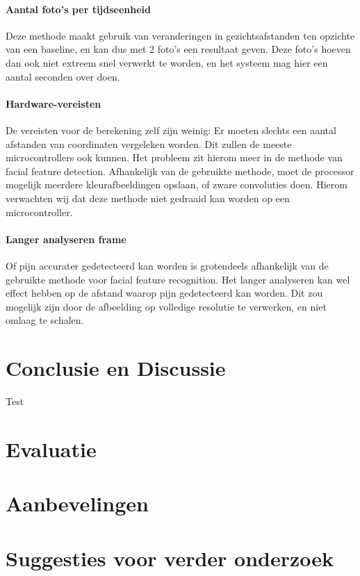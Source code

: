 \documentclass[11pt]{article}
\begin{document}
    \paragraph{Aantal foto's per tijdseenheid}
    Deze methode maakt gebruik van veranderingen in gezichtsafstanden ten opzichte van een baseline, en kan dus met 2 foto's een resultaat geven.
    Deze foto's hoeven dan ook niet extreem snel verwerkt te worden, en het systeem mag hier een aantal seconden over doen.

    \paragraph{Hardware-vereisten}
    De vereisten voor de berekening zelf zijn weinig: Er moeten slechts een aantal afstanden van coordinaten vergeleken worden.
    Dit zullen de meeste microcontrollers ook kunnen.
    Het probleem zit hierom meer in de methode van facial feature detection.
    Afhankelijk van de gebruikte methode, moet de processor mogelijk meerdere kleurafbeeldingen opslaan, of zware convoluties doen.
    Hierom verwachten wij dat deze methode niet gedraaid kan worden op een microcontroller.

    \paragraph{Langer analyseren frame}
    Of pijn accurater gedetecteerd kan worden is grotendeels afhankelijk van de gebruikte methode voor facial feature recognition.
    Het langer analyseren kan wel effect hebben op de afstand waarop pijn gedetecteerd kan worden.
    Dit zou mogelijk zijn door de afbeelding op volledige resolutie te verwerken, en niet omlaag te schalen.


    \section{Conclusie en Discussie}
    Test \citet{werner2014automatic}


    \section{Evaluatie}


    \section{Aanbevelingen}


    \section{Suggesties voor verder onderzoek}
\end{document}
